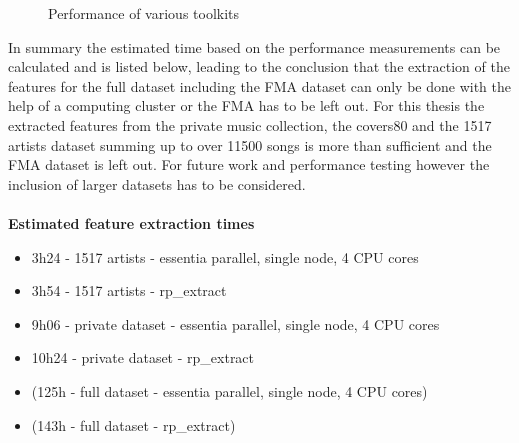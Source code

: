 \begin{figure}[htbp]
	\centering
	\caption{Performance of various toolkits}
	\label{perfex}
\end{figure}
In summary the estimated time based on the performance measurements can be calculated and is listed below, leading to the conclusion that the extraction of the features for the full dataset including the FMA dataset can only be done with the help of a computing cluster or the FMA has to be left out. For this thesis the extracted features from the private music collection, the covers80 and the 1517 artists dataset summing up to over 11500 songs is more than sufficient and the FMA dataset is left out. For future work and performance testing however the inclusion of larger datasets has to be considered. 
\ \\
\ \\
\textbf{Estimated feature extraction times}
\begin{itemize}
	\item 3h24 - 1517 artists - essentia parallel, single node, 4 CPU cores
	\item 3h54 - 1517 artists - rp\_extract
	\item 9h06 - private dataset - essentia parallel, single node, 4 CPU cores
	\item 10h24 - private dataset - rp\_extract
	\item (125h - full dataset - essentia parallel, single node, 4 CPU cores)
	\item (143h - full dataset - rp\_extract)
\end{itemize}
